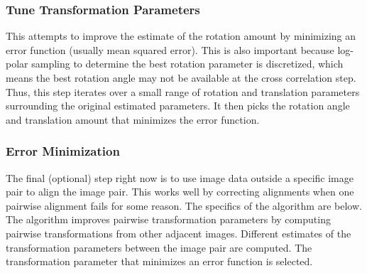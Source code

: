 \documentclass{article}
\begin{document}
\subsubsection{Tune Transformation Parameters}
This attempts to improve the estimate of the rotation amount by minimizing an error function (usually mean squared error). This is also important because log-polar sampling to determine the best rotation parameter is discretized, which means the best rotation angle may not be available at the cross correlation step. Thus, this step iterates over a small range of rotation and translation parameters surrounding the original estimated parameters. It then picks the rotation angle and translation amount that minimizes the error function.

\subsubsection{Error Minimization}
The final (optional) step right now is to use image data outside a specific image pair to align the image pair. This works well by correcting alignments when one pairwise alignment fails for some reason. The specifics of the algorithm are below. The algorithm improves pairwise transformation parameters by computing pairwise transformations from other adjacent images. Different estimates of the transformation parameters between the image pair are computed. The transformation parameter that minimizes an error function is selected. \\
\end{document}
